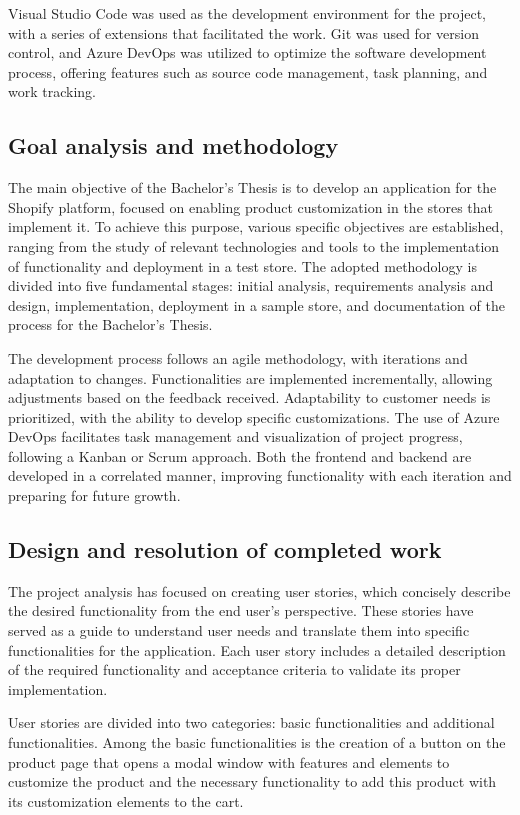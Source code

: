 \documentclass[12pt]{article}
\begin{document}
Visual Studio Code was used as the development environment for the project, with a series of extensions that facilitated the work. Git was 
used for version control, and Azure DevOps was utilized to optimize the software development process, offering features such as source code 
management, task planning, and work tracking.

\subsection{Goal analysis and methodology}
The main objective of the Bachelor's Thesis is to develop an application for the Shopify platform, focused on enabling product customization
in the stores that implement it. To achieve this purpose, various specific objectives are established, ranging from the study of relevant technologies
and tools to the implementation of functionality and deployment in a test store. The adopted methodology is divided into five 
fundamental stages: initial analysis, requirements analysis and design, implementation, deployment in a sample store, and documentation of the process for the Bachelor's Thesis.

The development process follows an agile methodology, with iterations and adaptation to changes. Functionalities are implemented incrementally,
allowing adjustments based on the feedback received. Adaptability to customer needs is prioritized, with the ability to develop specific customizations.
The use of Azure DevOps facilitates task management and visualization of project progress, following a Kanban or Scrum approach. Both the frontend 
and backend are developed in a correlated manner, improving functionality with each iteration and preparing for future growth.

\subsection{Design and resolution of completed work }
The project analysis has focused on creating user stories, which concisely describe the desired functionality from the end user's perspective.
These stories have served as a guide to understand user needs and translate them into specific functionalities for the application. 
Each user story includes a detailed description of the required functionality and acceptance criteria to validate its proper implementation.

User stories are divided into two categories: basic functionalities and additional functionalities. Among the basic functionalities is 
the creation of a button on the product page that opens a modal window with features and elements to customize the product and the necessary
functionality to add this product with its customization elements to the cart.
\end{document}
